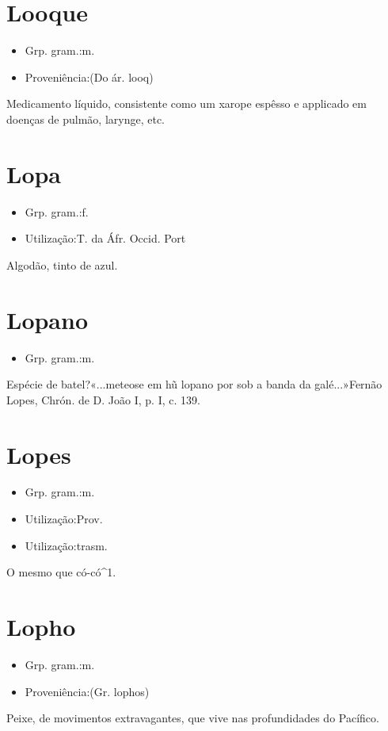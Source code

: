 \section{Looque}
\begin{itemize}
\item {Grp. gram.:m.}
\end{itemize}
\begin{itemize}
\item {Proveniência:(Do ár. \textunderscore looq\textunderscore )}
\end{itemize}
Medicamento líquido, consistente como um xarope espêsso e applicado em doenças de pulmão, larynge, etc.
\section{Lopa}
\begin{itemize}
\item {Grp. gram.:f.}
\end{itemize}
\begin{itemize}
\item {Utilização:T. da Áfr. Occid. Port}
\end{itemize}
Algodão, tinto de azul.
\section{Lopano}
\begin{itemize}
\item {Grp. gram.:m.}
\end{itemize}
Espécie de batel?«\textunderscore ...meteose em hũ lopano por sob a banda da galé\textunderscore ...»Fernão Lopes, \textunderscore Chrón. de D. João I\textunderscore , p. I, c. 139.
\section{Lopes}
\begin{itemize}
\item {Grp. gram.:m.}
\end{itemize}
\begin{itemize}
\item {Utilização:Prov.}
\end{itemize}
\begin{itemize}
\item {Utilização:trasm.}
\end{itemize}
O mesmo que \textunderscore có-có\textunderscore ^1.
\section{Lopho}
\begin{itemize}
\item {Grp. gram.:m.}
\end{itemize}
\begin{itemize}
\item {Proveniência:(Gr. \textunderscore lophos\textunderscore )}
\end{itemize}
Peixe, de movimentos extravagantes, que vive nas profundidades do Pacífico.
